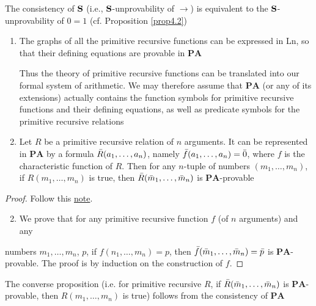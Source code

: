 \documentclass[11pt]{article}
\def \PA {\textbf{PA}}
\begin{document}
\begin{lemma}[]
\label{lemma10.5}
The consistency of \(\operatorname{\textbf{S}}\) (i.e., \(\operatorname{\textbf{S}}\)-unprovability of \(\to\)) is equivalent to
the \(\operatorname{\textbf{S}}\)-unprovability of \(0=1\) (cf. Proposition \ref{prop4.2})
\end{lemma}

\begin{proposition}[Gödel]
\label{prop10.6}
\begin{enumerate}
\item The graphs of all the primitive recursive functions can be expressed in Ln, so that their
defining equations are provable in \(\PA\)

Thus the theory of primitive recursive functions can be translated into our formal system of
arithmetic. We may therefore assume that \(\PA\) (or any of its extensions) actually contains
the function symbols for primitive recursive functions and their defining equations, as well
as predicate symbols for the primitive recursive relations
\item Let \(R\) be a primitive recursive relation of \(n\) arguments. It can be represented
in \(\PA\) by a formula \(\bar{R}(a_1,\dots,a_n)\), namely \(\bar{f}(a_1,\dots,a_n)=\bar{0}\),
where \(f\) is the characteristic function of \(R\). Then for any \(n\)-tuple of
numbers \((m_1,\dots,m_n)\), if \(R(m_1,\dots,m_n)\) is true,
then \(\bar{R}(\bar{m}_1,\dots,\bar{m}_n)\) is \(\PA\)-provable
\end{enumerate}
\end{proposition}

\begin{proof}
Follow this \href{http://www.cs.cornell.edu/courses/cs4860/2009sp/lec-22.pdf}{note}.


\begin{enumerate}
\setcounter{enumi}{1}
\item We prove that for any primitive recursive function \(f\) (of \(n\) arguments) and any
\end{enumerate}
numbers \(m_1,\dots,m_n\), \(p\), if \(f(n_1,\dots,m_n)=p\),
then \(\bar{f}(\bar{m}_1,\dots,\bar{m}_n)=\bar{p}\) is \(\PA\)-provable. The proof is by induction on
the construction of \(f\).
\end{proof}

The converse proposition (i.e. for primitive recursive \(R\), if \(\bar{R}(\bar{m}_1,\dots,\bar{m}_n)\)
is \(\PA\)-provable, then \(R(m_1,\dots,m_n)\) is true) follows from the consistency of \(\PA\)
\end{document}
